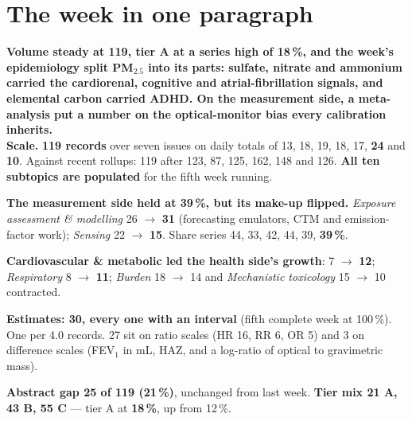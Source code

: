 \documentclass[10pt]{article}
\begin{document}
\vspace{6mm}

\section*{\sffamily\bfseries\color{Deep}The week in one paragraph}
\vspace{-1.5mm}{\color{Teal}\rule{\linewidth}{1.1pt}}\vspace{2.5mm}

\begin{keybox}
{\sffamily\bfseries\small\color{Deep}Volume steady at 119, tier A at a series high of 18\,\%, and the week's
epidemiology split PM$_{2.5}$ into its parts: sulfate, nitrate and ammonium carried the cardiorenal, cognitive and
atrial-fibrillation signals, and elemental carbon carried ADHD. On the measurement side, a meta-analysis put a
number on the optical-monitor bias every calibration inherits.}\\[1.4mm]
\footnotesize
\textbf{Scale.} \textbf{119 records} over seven issues on daily totals of 13, 18, 19, 18, 17, \textbf{24} and
\textbf{10}. Against recent rollups: 119 after 123, 87, 125, 162, 148 and 126. \textbf{All ten subtopics are
populated} for the fifth week running.

\textbf{The measurement side held at 39\,\%, but its make-up flipped.} \textit{Exposure assessment \&
modelling} 26 $\rightarrow$ \textbf{31} (forecasting emulators, CTM and emission-factor work); \textit{Sensing}
22 $\rightarrow$ \textbf{15}. Share series 44, 33, 42, 44, 39, \textbf{39\,\%}.

\textbf{Cardiovascular \& metabolic led the health side's growth}: 7 $\rightarrow$ \textbf{12};
\textit{Respiratory} 8 $\rightarrow$ \textbf{11}; \textit{Burden} 18 $\rightarrow$ 14 and \textit{Mechanistic
toxicology} 15 $\rightarrow$ 10 contracted.

\textbf{Estimates: 30, every one with an interval} (fifth complete week at 100\,\%). One per 4.0 records.
27 sit on ratio scales (HR 16, RR 6, OR 5) and 3 on difference scales (FEV$_1$ in mL, HAZ, and a log-ratio of
optical to gravimetric mass).

\textbf{Abstract gap 25 of 119 (21\,\%)}, unchanged from last week. \textbf{Tier mix 21 A, 43 B, 55 C} ---
tier A at \textbf{18\,\%}, up from 12\,\%.
\end{keybox}

\clearpage
\end{document}
